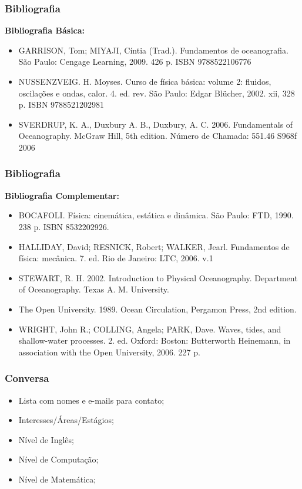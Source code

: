 \begin{frame}
    \frametitle{Bibliografia}
    {\scriptsize
    {\bf Bibliografia Básica:}
        \begin{itemize}[<+-| alert@+>]
            \item GARRISON, Tom; MIYAJI, Cíntia (Trad.). Fundamentos de
                  oceanografia. São Paulo: Cengage Learning, 2009. 426 p.
                  ISBN 9788522106776
            \item NUSSENZVEIG. H. Moyses. Curso de física básica: volume 2:
                  fluidos, oscilações e ondas, calor. 4. ed. rev. São Paulo:
                  Edgar Blücher, 2002. xii, 328 p. ISBN 9788521202981
            \item SVERDRUP, K. A., Duxbury A. B., Duxbury, A. C. 2006.
                  Fundamentals of Oceanography. McGraw Hill, 5th edition.
                  Número de Chamada: 551.46 S968f 2006
        \end{itemize}
    }
\end{frame}

\begin{frame}
    \frametitle{Bibliografia}
    {\scriptsize
    {\bf Bibliografia Complementar:}
    \begin{itemize}[<+-| alert@+>]
        \item BOCAFOLI. Física: cinemática, estática e dinâmica. São Paulo:
              FTD, 1990. 238 p. ISBN 8532202926.
        \item HALLIDAY, David; RESNICK, Robert; WALKER, Jearl. Fundamentos de
              física: mecânica. 7. ed. Rio de Janeiro: LTC, 2006. v.1
        \item STEWART, R. H. 2002. Introduction to Physical Oceanography.
              Department of Oceanography. Texas A. M. University.
        \item The Open University. 1989. Ocean Circulation, Pergamon Press,
              2nd edition.
        \item WRIGHT, John R.; COLLING, Angela; PARK, Dave. Waves, tides, and
              shallow-water processes. 2. ed. Oxford: Boston: Butterworth
              Heinemann, in association with the Open University, 2006. 227 p.
    \end{itemize}
    }
\end{frame}

\begin{frame}
    \frametitle{Conversa}
    \begin{itemize}
        \item Lista com nomes e e-mails para contato;
        \item Interesses/Áreas/Estágios;
        \item Nível de Inglês;
        \item Nível de Computação;
        \item Nível de Matemática;
    \end{itemize}
\end{frame}

